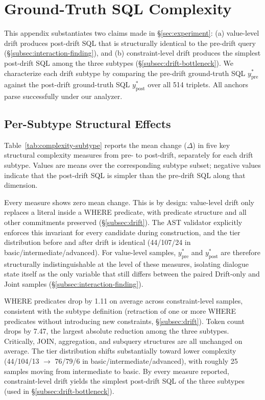 \section{Ground-Truth SQL Complexity}
\label{app:complexity}

This appendix substantiates two claims made in \S\ref{sec:experiment}: (a) value-level drift produces post-drift SQL that is structurally identical to the pre-drift query (\S\ref{subsec:interaction-finding}), and (b) constraint-level drift produces the simplest post-drift SQL among the three subtypes (\S\ref{subsec:drift-bottleneck}). We characterize each drift subtype by comparing the pre-drift ground-truth SQL $y_{\mathrm{pre}}^*$ against the post-drift ground-truth SQL $y_{\mathrm{post}}^*$ over all 514 triplets. All anchors parse successfully under our analyzer.

\subsection{Per-Subtype Structural Effects}
\label{subapp:subtype-effects}

Table~\ref{tab:complexity-subtype} reports the mean change ($\Delta$) in five key structural complexity measures from pre- to post-drift, separately for each drift subtype. Values are means over the corresponding subtype subset; negative values indicate that the post-drift SQL is
simpler than the pre-drift SQL along that dimension.


 Every measure shows zero mean change. This is by design: value-level drift only replaces a literal inside a WHERE predicate, with predicate structure and all other commitments preserved (\S\ref{subsec:drift}). The AST validator explicitly enforces this invariant for every candidate during construction, and the tier distribution before and after drift is identical (44/107/24 in basic/intermediate/advanced). For value-level samples, $y_{\mathrm{pre}}^*$ and $y_{\mathrm{post}}^*$ are therefore structurally indistinguishable at the level of these measures, isolating dialogue state itself as the only variable that still differs between the paired Drift-only and Joint samples (\S\ref{subsec:interaction-finding}).

 WHERE predicates drop by 1.11 on average across constraint-level samples, consistent with the subtype definition (retraction of one or more WHERE predicates without introducing new constraints, \S\ref{subsec:drift}). Token count drops by 7.47, the largest absolute reduction among the three subtypes. Critically, JOIN, aggregation, and subquery structures are all unchanged on average. The tier distribution shifts substantially toward lower complexity (44/104/13 $\to$ 76/79/6 in basic/intermediate/advanced), with roughly 25 samples moving from intermediate to basic. By every measure reported, constraint-level drift yields the simplest post-drift SQL of the three subtypes (used in \S\ref{subsec:drift-bottleneck}).



